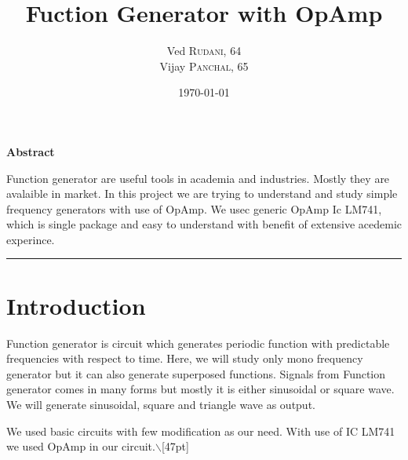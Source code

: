 \documentclass[12pt]{article}
\title{Fuction Generator with OpAmp}
\date{\today}
\author{Ved \textsc{Rudani}, 64 \\
  Vijay \textsc{Panchal}, 65}
\begin{document}
\begin{center}  
  \maketitle
  \vspace{0.3cm}
\colorbox{bg1}{
\begin{minipage}{.95\textwidth}\centering
        \vspace{1cm}
        \Large
        \textbf{Abstract}

        \begin{minipage}{0.9\textwidth}
        \vspace{.8cm}
        \normalsize
        Function generator are useful tools in academia and industries. Mostly they are avalaible in market. In this project we are trying to understand and study simple frequency generators with use of OpAmp. We usec generic OpAmp Ic LM741, which is single package and easy to understand with benefit of extensive acedemic experince.
        \vspace{1cm}
        \end{minipage}
\end{minipage}}
\end{center}

\begin{center}
\vspace{.3cm}
\noindent
\color{black} \rule{\linewidth}{.7mm}
\end{center}\tableofcontents
\pagebreak







\section{Introduction}
\label{sec:orga0cacab}
Function generator is circuit which generates periodic function with predictable frequencies with respect to time. Here, we will study only mono frequency generator but it can also generate superposed functions. Signals from Function generator comes in many forms but mostly it is either sinusoidal or square wave. We will generate sinusoidal, square and triangle wave as output. 

We used basic circuits with few modification as our need. With use of IC LM741 we used OpAmp in our circuit.$\backslash$[47pt]
\end{document}

